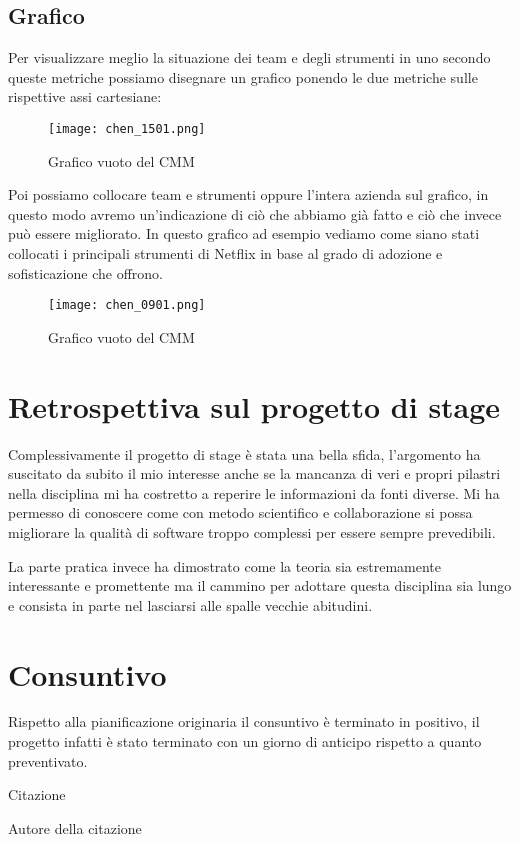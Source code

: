 \subsection{Grafico}
Per visualizzare meglio la situazione dei team e degli strumenti in uno secondo queste metriche possiamo disegnare un grafico ponendo le due metriche sulle rispettive assi cartesiane:
\begin{figure}[h]
    \centering
    \texttt{[image: chen\_1501.png]}
    \caption{Grafico vuoto del CMM}
    \label{tab:grafico-vuoto-cmm} 
\end{figure}
Poi possiamo collocare team e strumenti oppure l'intera azienda sul grafico, in questo modo avremo un'indicazione di ciò che abbiamo già fatto e ciò che invece può essere migliorato.
In questo grafico ad esempio vediamo come siano stati collocati i principali strumenti di Netflix in base al grado di adozione e sofisticazione che offrono.
\begin{figure}[h]
    \centering
    \texttt{[image: chen\_0901.png]}
    \caption{Grafico vuoto del CMM}
    \label{tab:grafico-vuoto-cmm}
\end{figure}

\section{Retrospettiva sul progetto di stage}
Complessivamente il progetto di stage è stata una bella sfida, l'argomento ha suscitato da subito il mio interesse anche se la mancanza di veri e propri pilastri nella disciplina mi ha costretto a reperire le informazioni da fonti diverse.
Mi ha permesso di conoscere come con metodo scientifico e collaborazione si possa migliorare la qualità di software troppo complessi per essere sempre prevedibili.

La parte pratica invece ha dimostrato come la teoria sia estremamente interessante e promettente ma il cammino per adottare questa disciplina sia lungo e consista in parte nel lasciarsi alle spalle vecchie abitudini.


\section{Consuntivo}
Rispetto alla pianificazione originaria il consuntivo è terminato in positivo, il progetto infatti è stato terminato con un giorno di anticipo rispetto a quanto preventivato.



\epigraph{Citazione}{Autore della citazione}



